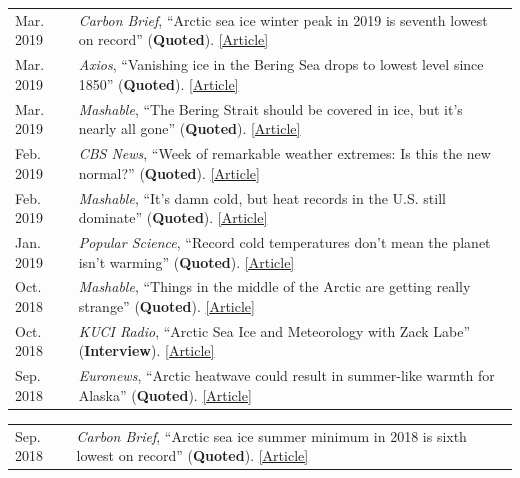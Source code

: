 \documentclass[margin,line,palatino,courier,10pt]{res}
\begin{document}
\begin{resume}
\begin{tabular}{@{}p{0.9in}p{4in}}
Mar. 2019 & \textit{Carbon Brief}, ``Arctic sea ice winter peak in 2019 is seventh lowest on record'' (\textbf{Quoted}). \href{https://www.carbonbrief.org/arctic-sea-ice-winter-peak-in-2019-is-seventh-lowest-on-record}{[Article]}\\
Mar. 2019 & \textit{Axios}, ``Vanishing ice in the Bering Sea drops to lowest level since 1850'' (\textbf{Quoted}). \href{https://www.axios.com/bering-sea-ice-vanishing-a23bacda-a08d-4ec7-9124-419b90b984a2.html}{[Article]}\\
Mar. 2019 &\textit{Mashable}, ``The Bering Strait should be covered in ice, but it's nearly all gone'' (\textbf{Quoted}). \href{https://mashable.com/article/bering-strait-sea-ice-gone-2019-arctic/#zs3hdvbg3mqc}{[Article]}\\
Feb. 2019 & \textit{CBS News}, ``Week of remarkable weather extremes: Is this the new normal?'' (\textbf{Quoted}). \href{https://www.cbsnews.com/news/remarkable-weather-extremes-is-this-the-new-normal-climate-change/?ftag=CNM-00-10aab7e&linkId=64169123}{[Article]}\\
Feb. 2019 & \textit{Mashable}, ``It's damn cold, but heat records in the U.S. still dominate'' (\textbf{Quoted}). \href{https://mashable.com/article/polar-vortex-climate-change-cold-record/#xQmvXhcFJPqH}{[Article]}\\
Jan. 2019 & \textit{Popular Science}, ``Record cold temperatures don't mean the planet isn't warming'' (\textbf{Quoted}). \href{https://www.popsci.com/cold-weather-climate-change}{[Article]}\\
Oct. 2018 & \textit{Mashable}, ``Things in the middle of the Arctic are getting really strange'' (\textbf{Quoted}). \href{https://mashable.com/article/low-arctic-ice-central-basin/#xQmvXhcFJPqH}{[Article]}\\
Oct. 2018 & \textit{KUCI Radio}, ``Arctic Sea Ice and Meteorology with Zack Labe'' (\textbf{Interview}). \href{https://thesciencespiel.org/2018/10/08/october-8-2018-arctic-sea-ice-and-meteorology-with-zack-labe/}{[Article]}\\
Sep. 2018 & \textit{Euronews}, ``Arctic heatwave could result in summer-like warmth for Alaska'' (\textbf{Quoted}). \href{https://www.euronews.com/2018/09/29/arctic-heatwave-could-result-in-summer-like-warmth-in-alaska}{[Article]}\\
\end{tabular}
\begin{tabular}{@{}p{0.9in}p{4in}}
Sep. 2018 & \textit{Carbon Brief}, ``Arctic sea ice summer minimum in 2018 is sixth lowest on record'' (\textbf{Quoted}). \href{https://www.carbonbrief.org/arctic-sea-ice-summer-minimum-in-2018-is-sixth-lowest-on-record}{[Article]}\\

\end{tabular}
\end{resume}
\end{document}
